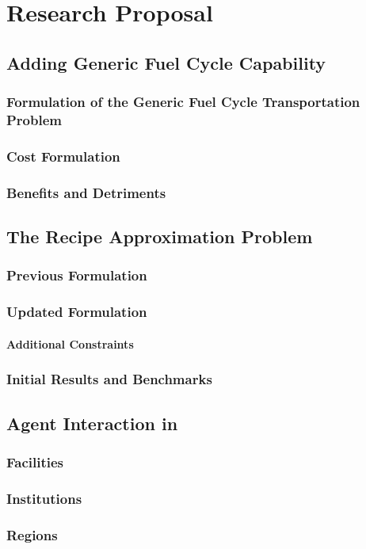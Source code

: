 \chapter{Research Proposal}\label{ch:research}



\section{Adding Generic Fuel Cycle Capability}

\subsection{Formulation of the Generic Fuel Cycle Transportation Problem}
\subsection{Cost Formulation}
\subsection{Benefits and Detriments}

\section{The Recipe Approximation Problem}

\subsection{Previous Formulation}
\subsection{Updated Formulation}
\subsubsection{Additional Constraints}
\subsection{Initial Results and Benchmarks}

\section{Agent Interaction in \Cyclus}

\subsection{Facilities}
\subsection{Institutions}
\subsection{Regions}
